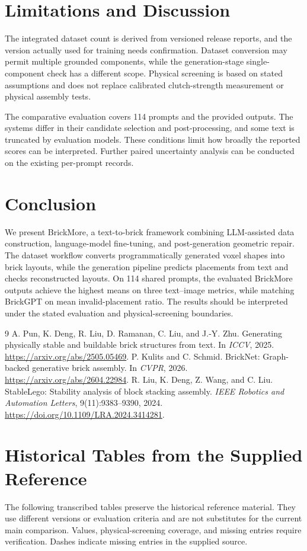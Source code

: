 \documentclass[10pt,twocolumn,letterpaper]{article}
\begin{document}
\section{Limitations and Discussion}
The integrated dataset count is derived from versioned release reports, and the version actually used for training needs confirmation. Dataset conversion may permit multiple grounded components, while the generation-stage single-component check has a different scope. Physical screening is based on stated assumptions and does not replace calibrated clutch-strength measurement or physical assembly tests.

The comparative evaluation covers 114 prompts and the provided outputs. The systems differ in their candidate selection and post-processing, and some text is truncated by evaluation models. These conditions limit how broadly the reported scores can be interpreted. Further paired uncertainty analysis can be conducted on the existing per-prompt records.

\section{Conclusion}
We present BrickMore, a text-to-brick framework combining LLM-assisted data construction, language-model fine-tuning, and post-generation geometric repair. The dataset workflow converts programmatically generated voxel shapes into brick layouts, while the generation pipeline predicts placements from text and checks reconstructed layouts. On 114 shared prompts, the evaluated BrickMore outputs achieve the highest means on three text--image metrics, while matching BrickGPT on mean invalid-placement ratio. The results should be interpreted under the stated evaluation and physical-screening boundaries.

\FloatBarrier
{\footnotesize
\begin{thebibliography}{9}
 A. Pun, K. Deng, R. Liu, D. Ramanan, C. Liu, and J.-Y. Zhu. Generating physically stable and buildable brick structures from text. In \emph{ICCV}, 2025. \url{https://arxiv.org/abs/2505.05469}.
 P. Kulits and C. Schmid. BrickNet: Graph-backed generative brick assembly. In \emph{CVPR}, 2026. \url{https://arxiv.org/abs/2604.22984}.
 R. Liu, K. Deng, Z. Wang, and C. Liu. StableLego: Stability analysis of block stacking assembly. \emph{IEEE Robotics and Automation Letters}, 9(11):9383--9390, 2024. \url{https://doi.org/10.1109/LRA.2024.3414281}.
\end{thebibliography}}
\clearpage
\onecolumn
\appendix
\section{Historical Tables from the Supplied Reference}
The following transcribed tables preserve the historical reference material. They use different versions or evaluation criteria and are not substitutes for the current main comparison. Values, physical-screening coverage, and missing entries require verification. Dashes indicate missing entries in the supplied source.

\end{document}
